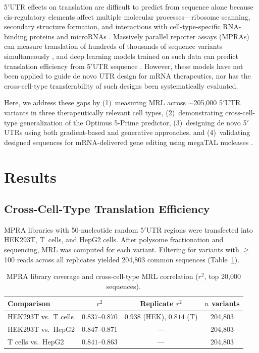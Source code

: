 \documentclass[11pt]{article}
\begin{document}
5$'$UTR effects on translation are difficult to predict from sequence alone because cis-regulatory elements affect multiple molecular processes---ribosome scanning, secondary structure formation, and interactions with cell-type-specific RNA-binding proteins and microRNAs \citep{jackson2010mechanism, dvir2013deciphering}. Massively parallel reporter assays (MPRAs) can measure translation of hundreds of thousands of sequence variants simultaneously \citep{sample2019human, weingarten2016deep, noderer2014quantitative}, and deep learning models trained on such data can predict translation efficiency from 5$'$UTR sequence \citep{sample2019human, cao2021high}. However, these models have not been applied to guide de novo UTR design for mRNA therapeutics, nor has the cross-cell-type transferability of such designs been systematically evaluated.

Here, we address these gaps by (1)~measuring MRL across $\sim$205,000 5$'$UTR variants in three therapeutically relevant cell types, (2)~demonstrating cross-cell-type generalization of the Optimus 5-Prime predictor, (3)~designing de novo 5$'$UTRs using both gradient-based and generative approaches, and (4)~validating designed sequences for mRNA-delivered gene editing using megaTAL nucleases \citep{killian2017installgen}.

\section{Results}

\subsection{Cross-Cell-Type Translation Efficiency}

MPRA libraries with 50-nucleotide random 5$'$UTR regions were transfected into HEK293T, T~cells, and HepG2 cells. After polysome fractionation and sequencing, MRL was computed for each variant. Filtering for variants with $\geq$100 reads across all replicates yielded 204,803 common sequences (Table~\ref{tab:library}).

\begin{table}[H]
\centering
\caption{MPRA library coverage and cross-cell-type MRL correlation ($r^2$, top 20,000 sequences).}
\label{tab:library}
\begin{tabular}{@{}lccc@{}}
\toprule
Comparison & $r^2$ & Replicate $r^2$ & $n$ variants \\
\midrule
HEK293T vs.\ T cells & $0.837$--$0.870$ & $0.938$ (HEK), $0.814$ (T) & 204,803 \\
HEK293T vs.\ HepG2 & $0.847$--$0.871$ & --- & 204,803 \\
T cells vs.\ HepG2 & $0.841$--$0.863$ & --- & 204,803 \\
\bottomrule
\end{tabular}
\end{table}
\end{document}
